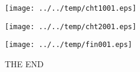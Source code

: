 \documentclass[a4paper,twoside,11pt]{article}
\makeatletter
\def\maxwidth{%
  \ifdim\Gin@nat@width>\linewidth
    \linewidth
  \else
    \Gin@nat@width
  \fi
}
\makeatother
\begin{document}
\clearpage
\begin{figure}
  \centering
  \texttt{[image: ../../temp/cht1001.eps]}
\end{figure}


\clearpage
\begin{figure}
  \centering
  \texttt{[image: ../../temp/cht2001.eps]}
  \label{fig:cht2001}
\end{figure}


\clearpage
\begin{figure}
  \centering
  \texttt{[image: ../../temp/fin001.eps]}
  \caption{THE END}
  \label{fig:fin001}
\end{figure}
\end{document}
